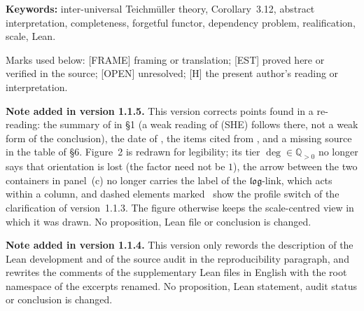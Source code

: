 \documentclass[11pt]{article}
\theoremstyle{plain}
\theoremstyle{definition}
\theoremstyle{remark}
\newcommand{\FRAME}{\textup{[FRAME]}}
\newcommand{\EST}{\textup{[EST]}}
\newcommand{\OPEN}{\textup{[OPEN]}}
\newcommand{\Hmark}{\textup{[H]}}
\begin{document}
\begin{abstract}
An audit of the interface-relevant ranges in IUT~I--IV and in
\cite{FrdI,EtTh,AbsTopIII}, summarized interface by interface in
\S6, finds the other audited interfaces closed for their local
queries, with the qualifications recorded there: Tate parameter
reconstruction, cyclotomic synchronization, the discrete valuation
step, unit-side indeterminacy at the readout, within-copy volume
normalization, and the three-tier classification of degrees under
realification.  On the input side, what controls $\Delta$ is a
single square: whether the actual construction supplies a lift of
the $\Theta$-link, given between bare prime-strips, to marked
prime-strips preserving generators and scale.  A separate item
remains open on the output side: the identification of the source's
holomorphic hull family with the same-run full-image family.
The reduction also shrinks the formalization target: what has to be
formalized is not all of IUT, but only the interfaces needed to
decide the sign of $\Delta$.  This paper decides neither
Corollary~3.12 nor the ABC conjecture.
\end{abstract}

\noindent\textbf{Keywords:} inter-universal Teichm\"uller theory,
Corollary~3.12, abstract interpretation, completeness, forgetful
functor, dependency problem, realification, scale, Lean.

\medskip
\noindent Marks used below: \FRAME{} framing or translation;
\EST{} proved here or verified in the source; \OPEN{} unresolved;
\Hmark{} the present author's reading or interpretation.

\medskip
\noindent\textbf{Note added in version 1.1.5.}
This version corrects points found in a re-reading: the summary of
\cite{U26} in \S1 (a weak reading of (SHE) follows there, not a weak
form of the conclusion), the date of \cite{SS18}, the items cited from
\cite[Cor.~2.19]{EtTh}, and a missing source in the table of \S6.
Figure~2 is redrawn for legibility; its tier $\deg\in\mathbb Q_{>0}$
no longer says that orientation is lost (the factor need not be $1$),
the arrow between the two containers in panel~(c) no longer carries
the label of the $\mathfrak{log}$-link, which acts within a column,
and dashed elements marked \dag\ show the profile switch of the
clarification of version~1.1.3.  The figure otherwise keeps the
scale-centred view in which it was drawn.  No proposition, Lean
file or conclusion is changed.

\medskip
\noindent\textbf{Note added in version 1.1.4.}
This version only rewords the description of the Lean development and
of the source audit in the reproducibility paragraph, and rewrites the
comments of the supplementary Lean files in English with the root
namespace of the excerpts renamed.  No proposition, Lean statement,
audit status or conclusion is changed.
\end{document}
